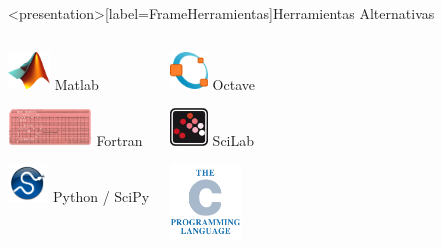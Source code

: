 
\mode*

\begin{frame}<presentation>[label=FrameHerramientas]{Herramientas Alternativas}

\begin{columns} 

\begin{center}

\includegraphics[height=1cm]{./media/Matlab_Logo.png}
\LARGE Matlab \par
\vspace{1cm} 

\includegraphics[height=1cm]{./media/punch.jpg}
\LARGE Fortran \par
\vspace{1cm} 

\includegraphics[height=1cm]{./media/scipyshiny_small.png}
\LARGE Python / SciPy \par
\end{center}


\begin{center}

\includegraphics[height=1cm]{./media/logo_octave.png}
\LARGE Octave \par
\vspace{1cm} 

\includegraphics[height=1cm]{./media/scilab.png}
\LARGE SciLab \par
\vspace{1cm} 

\includegraphics[height=2cm]{./media/The_C_Programming_Language_logo.png}


\end{center}
\end{columns}
\end{frame}
